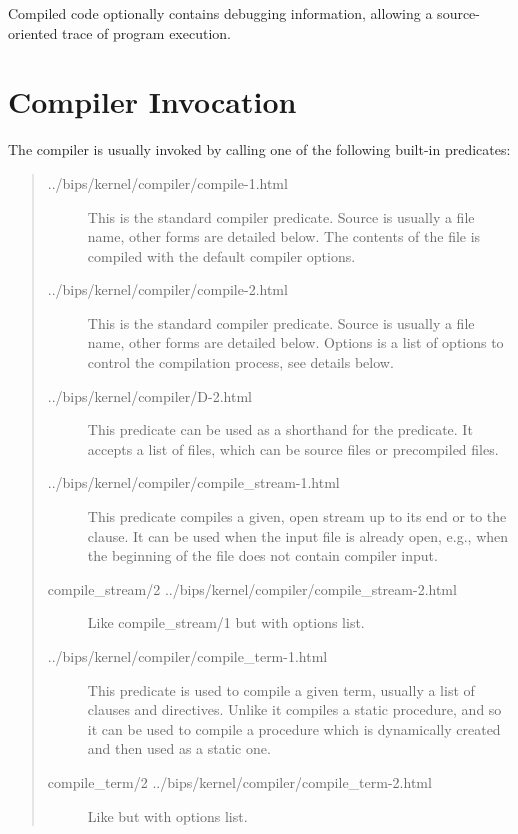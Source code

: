 Compiled code optionally contains debugging information, allowing a
source-oriented trace of program execution.


\section{Compiler Invocation}

The compiler is usually invoked by calling one of the following built-in
predicates:
\begin{quote}
\begin{description}
\item[%
{../bips/kernel/compiler/compile-1.html}]
This is the standard compiler predicate.
Source is usually a file name, other forms are detailed below.
The contents of the file is compiled with the default compiler options.

\item[%
{../bips/kernel/compiler/compile-2.html}]
This is the standard compiler predicate.
Source is usually a file name, other forms are detailed below.
Options is a list of options to control the compilation process, see details
below.

\item[%
{../bips/kernel/compiler/D-2.html}]
This predicate can be used as a shorthand for the
predicate.
It accepts a list of files, which can be source files or precompiled files.

\item[%
{../bips/kernel/compiler/compile_stream-1.html}]
This predicate compiles a given, open stream up to its end
or to the  clause.
It can be used when the input file is already open,
e.g., when the beginning of the file does not contain
compiler input.

\item[%
{compile_stream/2}%
{../bips/kernel/compiler/compile_stream-2.html}]
Like compile_stream/1 but with options list.

\item[%
{../bips/kernel/compiler/compile_term-1.html}]
This predicate is used to compile a given term,
usually a list of clauses and directives.
Unlike  it compiles
a static procedure,
and so it can be used to compile a procedure which is dynamically
created and then used as a static one.

\item[%
{compile_term/2}%
{../bips/kernel/compiler/compile_term-2.html}]
Like  but with options list.
\end{description}
\end{quote}

